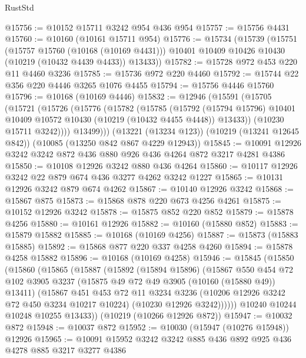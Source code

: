 \begin{lexlean}{RustStd}
\begin{coremodule}
@15756 := @10152 @15711 @3242 @954 @436 @954
@15757 := @15756 @4431
@15760 := @10160 (@10161 @15711 @954)
@15776 := @15734
    (@15739
      (@15751
        (@15757 @15760 (@10168 (@10169 @4431)))
        @10401
        @10409
        @10426
        @10430
        (@10219 (@10432 @4439 @4433))
        @13433))
@15782 := @15728 @972 @453 @220 @11 @4460 @3236
@15785 := @15736 @972 @220 @4460
@15792 := @15744 @22 @356 @220 @4446 @3265 @1076 @4455
@15794 := @15756 @4446 @15760
@15796 := @10168 (@10169 @4446)
@15832 := @12946
    (@15591
      (@15705
        (@15721
          (@15726
            (@15776
              (@15782
                (@15785
                  (@15792
                    (@15794 @15796)
                    @10401
                    @10409
                    @10572
                    @10430
                    (@10219 (@10432 @4455 @4448))
                    @13433))
                (@10230 @15711 @3242))))
          @13499)))
    (@13221 (@13234 @123))
    (@10219 (@13241 @12645 @842))
    (@10085 (@13250 @842 @867 @4229 @12943))
@15845 := @10091 @12926 @3242 @3242 @872 @436 @880 @926 @436 @4264 @872 @3217 @4281 @4386
@15850 := @10108 @12926 @3242 @880 @436 @4264
@15860 := @10117 @12926 @3242 @22 @879 @674 @436 @3277 @4262 @3242 @1227
@15865 := @10131 @12926 @3242 @879 @674 @4262
@15867 := @10140 @12926 @3242
@15868 := @15867 @875
@15873 := @15868 @878 @220 @673 @4256 @4261
@15875 := @10152 @12926 @3242
@15878 := @15875 @852 @220 @852
@15879 := @15878 @4256
@15880 := @10161 @12926
@15882 := @10160 (@15880 @852)
@15883 := @15879 @15882
@15885 := @10168 (@10169 @4256)
@15887 := @15873 (@15883 @15885)
@15892 := @15868 @877 @220 @337 @4258 @4260
@15894 := @15878 @4258 @15882
@15896 := @10168 (@10169 @4258)
@15946 := @15845
    (@15850
      (@15860
        (@15865
          (@15887
            (@15892
              (@15894 @15896)
              (@15867
                @550
                @454
                @72
                @102
                @3905
                @3237
                (@15875 @49 @72 @49 @3905 (@10160 (@15880 @49)) @13411)
                (@15867
                  @451
                  @453
                  @72
                  @11
                  @3234
                  @3236
                  (@10206 @12926 @3242 @72 @450 @3234 @10217 @10224)
                  (@10230 @12926 @3242))))))
        @10240
        @10244
        @10248
        @10255
        @13433))
    (@10219 (@10266 @12926 @872))
@15947 := @10032 @872
@15948 := @10037 @872
@15952 := @10030 (@15947 (@10276 @15948)) @12926
@15965 := @10091 @15952 @3242 @3242 @885 @436 @892 @925 @436 @4278 @885 @3217 @3277 @4386

\end{coremodule}
\end{lexlean}
